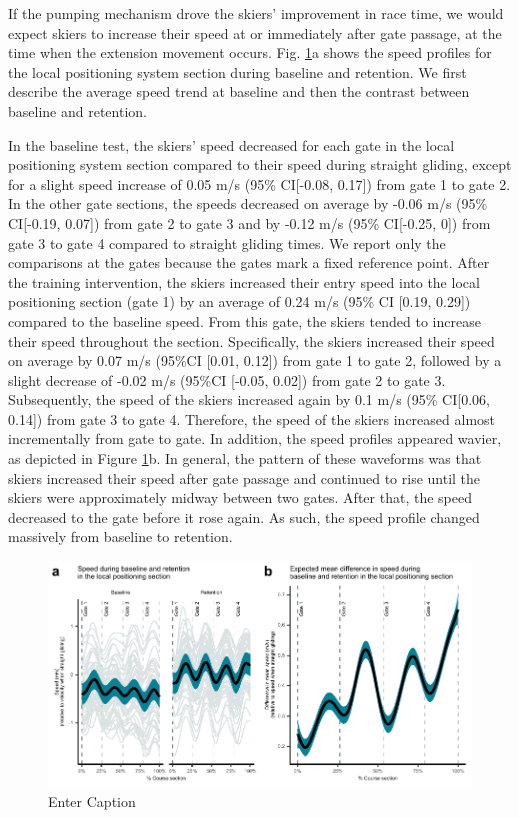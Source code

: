 If the pumping mechanism drove the skiers' improvement in race time, we would expect skiers to increase their speed at or immediately after gate passage, at the time when the extension movement occurs. Fig. \ref{fig:lps_speed}a shows the speed profiles for the local positioning system section during baseline and retention. We first describe the average speed trend at baseline and then the contrast between baseline and retention.

In the baseline test, the skiers’ speed decreased for each gate in the local positioning system section compared to their speed during straight gliding, except for a slight speed increase of 0.05 m/s (95\% CI[-0.08, 0.17]) from gate 1 to gate 2. In the other gate sections, the speeds decreased on average by -0.06 m/s (95\% CI[-0.19, 0.07]) from gate 2 to gate 3 and by -0.12 m/s (95\% CI[-0.25, 0]) from gate 3 to gate 4 compared to straight gliding times. We report only the comparisons at the gates because the gates mark a fixed reference point. After the training intervention, the skiers increased their entry speed into the local positioning section (gate 1) by an average of 0.24 m/s (95\% CI [0.19, 0.29]) compared to the baseline speed. From this gate, the skiers tended to increase their speed throughout the section. Specifically, the skiers increased their speed on average by 0.07 m/s (95\%CI [0.01, 0.12]) from gate 1 to gate 2, followed by a slight decrease of -0.02 m/s (95\%CI [-0.05, 0.02]) from gate 2 to gate 3. Subsequently, the speed of the skiers increased again by 0.1 m/s (95\% CI[0.06, 0.14]) from gate 3 to gate 4. Therefore, the speed of the skiers increased almost incrementally from gate to gate. In addition, the speed profiles appeared wavier, as depicted in Figure \ref{fig:lps_speed}b. In general, the pattern of these waveforms was that skiers increased their speed after gate passage and continued to rise until the skiers were approximately midway between two gates. After that, the speed decreased to the gate before it rose again. As such, the speed profile changed massively from baseline to retention. 

\begin{figure}
    \centering
    \includegraphics[width=1\linewidth]{figure/figure_speed.pdf}
    \caption{Enter Caption}
    \label{fig:lps_speed}
\end{figure}


